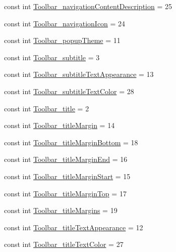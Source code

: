 \begin{CompactItemize}
const int \hyperlink{class__2doo_1_1_droid_1_1_resource_1_1_styleable_39973d088e7557349ee84eaeb03c3013}{Toolbar\_\-navigationContentDescription} = 25
\item 
const int \hyperlink{class__2doo_1_1_droid_1_1_resource_1_1_styleable_8d96bf9141298f4c3ca6fbcc47a5d07e}{Toolbar\_\-navigationIcon} = 24
\item 
const int \hyperlink{class__2doo_1_1_droid_1_1_resource_1_1_styleable_a4ae0c2c3a7606fad7c8629fb6545ade}{Toolbar\_\-popupTheme} = 11
\item 
const int \hyperlink{class__2doo_1_1_droid_1_1_resource_1_1_styleable_8364fbf733334e933445db1a02f69c34}{Toolbar\_\-subtitle} = 3
\item 
const int \hyperlink{class__2doo_1_1_droid_1_1_resource_1_1_styleable_4d03245b08b37aa951d35a8764c4cb7f}{Toolbar\_\-subtitleTextAppearance} = 13
\item 
const int \hyperlink{class__2doo_1_1_droid_1_1_resource_1_1_styleable_0574fcbab26eb99af6b2fc6cf800b4d5}{Toolbar\_\-subtitleTextColor} = 28
\item 
const int \hyperlink{class__2doo_1_1_droid_1_1_resource_1_1_styleable_89a544d881af0a2bc745181cedc7b711}{Toolbar\_\-title} = 2
\item 
const int \hyperlink{class__2doo_1_1_droid_1_1_resource_1_1_styleable_a5fbd1c382553dcb297db1f1e12be105}{Toolbar\_\-titleMargin} = 14
\item 
const int \hyperlink{class__2doo_1_1_droid_1_1_resource_1_1_styleable_5822f4f15569c507add2ea63bee96dc2}{Toolbar\_\-titleMarginBottom} = 18
\item 
const int \hyperlink{class__2doo_1_1_droid_1_1_resource_1_1_styleable_374d96b99c3494c50142e9c6c8a1e0c0}{Toolbar\_\-titleMarginEnd} = 16
\item 
const int \hyperlink{class__2doo_1_1_droid_1_1_resource_1_1_styleable_0b0e53ed2a7bf663bd26062fe3e52449}{Toolbar\_\-titleMarginStart} = 15
\item 
const int \hyperlink{class__2doo_1_1_droid_1_1_resource_1_1_styleable_f7f58f000b945e70e6ea7c7103d5851f}{Toolbar\_\-titleMarginTop} = 17
\item 
const int \hyperlink{class__2doo_1_1_droid_1_1_resource_1_1_styleable_f915bfbb461a529521ee0874b874b38a}{Toolbar\_\-titleMargins} = 19
\item 
const int \hyperlink{class__2doo_1_1_droid_1_1_resource_1_1_styleable_51b384061de37224fe4467ff6022f34a}{Toolbar\_\-titleTextAppearance} = 12
\item 
const int \hyperlink{class__2doo_1_1_droid_1_1_resource_1_1_styleable_675b0168f26b3eb3afab02d17dcc40f2}{Toolbar\_\-titleTextColor} = 27

\end{CompactItemize}
